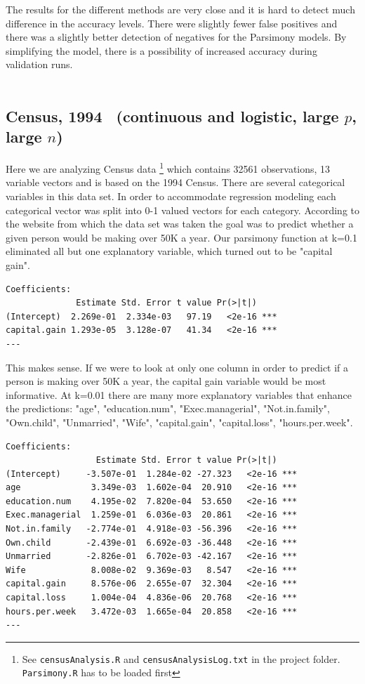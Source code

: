 \documentclass[letter]{article}
\newcounter{foot}
\begin{document}
The results for the different methods are very close and it is hard to detect much difference in the accuracy levels. There were slightly fewer false positives and there was a slightly better detection of negatives for the Parsimony models. By simplifying the model, there is a possibility of increased accuracy during validation runs.
\\
\\


\subsection*{Census, 1994~\cite{census} (continuous and logistic, large $p$, large $n$)}
Here we are analyzing Census data \footnote{See \texttt{censusAnalysis.R} and \texttt{censusAnalysisLog.txt} in the project folder. \texttt{Parsimony.R} has to be loaded first}
which contains 32561 observations, 13 variable vectors and is based on the 1994 Census. There are several categorical variables in this data set. In order to accommodate regression modeling each categorical vector was split into 0-1 valued vectors for each category. According to the website from which the data set was taken the goal was to predict whether a given person would be making over 50K a year.  Our parsimony function at k=0.1 eliminated all but one explanatory variable, which turned out to be "capital gain". 
\begin{verbatim}
Coefficients:
              Estimate Std. Error t value Pr(>|t|)    
(Intercept)  2.269e-01  2.334e-03   97.19   <2e-16 ***
capital.gain 1.293e-05  3.128e-07   41.34   <2e-16 ***
---

\end{verbatim}

This makes sense. If we were to look at only one column in order to predict if a person is making over 50K a year, the capital gain variable would be most informative. At k=0.01 there are many more explanatory variables that enhance the predictions:  "age", "education.num", "Exec.managerial", "Not.in.family", "Own.child", "Unmarried", "Wife", "capital.gain", "capital.loss", "hours.per.week".

\begin{verbatim}
Coefficients:
                  Estimate Std. Error t value Pr(>|t|)    
(Intercept)     -3.507e-01  1.284e-02 -27.323   <2e-16 ***
age              3.349e-03  1.602e-04  20.910   <2e-16 ***
education.num    4.195e-02  7.820e-04  53.650   <2e-16 ***
Exec.managerial  1.259e-01  6.036e-03  20.861   <2e-16 ***
Not.in.family   -2.774e-01  4.918e-03 -56.396   <2e-16 ***
Own.child       -2.439e-01  6.692e-03 -36.448   <2e-16 ***
Unmarried       -2.826e-01  6.702e-03 -42.167   <2e-16 ***
Wife             8.008e-02  9.369e-03   8.547   <2e-16 ***
capital.gain     8.576e-06  2.655e-07  32.304   <2e-16 ***
capital.loss     1.004e-04  4.836e-06  20.768   <2e-16 ***
hours.per.week   3.472e-03  1.665e-04  20.858   <2e-16 ***
---
\end{verbatim}
\end{document}
